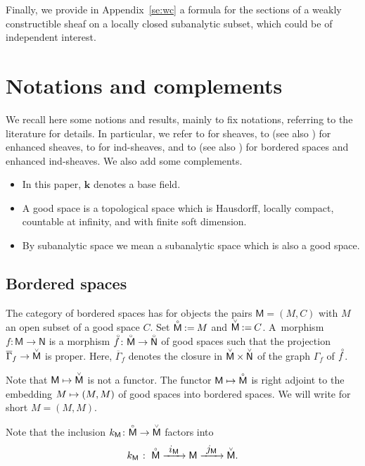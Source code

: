 \documentclass[JEP,XML,SOM,Unicode]{cedram}
\newcommand\mto{\mathchoice{\longmapsto}{\mapsto}{\mapsto}{\mapsto}}
\newcommand{\To}[1][]{\mathchoice{\xrightarrow{\textstyle\kern4pt#1\kern3pt}}{\stackrel{#1}{\longrightarrow}}{}{}}
\theoremstyle{plain}
\theoremstyle{definition}
\newcommand{\field}{\mathbf{k}}\let\cor\field
\newcommand{\bclose}[1]{{\accentset{\vee}{#1}}}\let\cc\bclose
\newcommand{\unbordered}[1]{{\accentset{\circ}{#1}}}
\let\oo \unbordered
\newcommand{\bbM}{\mathsf{M}}
\newcommand{\obM}{\unbordered{\bbM}}
\newcommand{\cbM}{\bclose{\bbM}}
\newcommand{\bbN}{\mathsf{N}}
\newcommand{\obN}{\unbordered{\bbN}}
\newcommand{\cbN}{\bclose{\bbN}}
\newcommand{\inc}[1][\bbM]{k_{#1}}
\let\ccM C
\newcommand{\defeq}{\mathbin{:=}}\let \seteq\defeq
\begin{document}
Finally, we provide in Appendix~\ref{se:wc} a formula for the sections of a weakly constructible sheaf on a locally closed subanalytic subset, which could be of independent interest.

\section{Notations and complements}\label{se:not}
We recall here some notions and results, mainly to fix notations, referring to the literature for details. In particular, we refer to \cite{KS90} for sheaves, to \cite{Tam08} (see also \cite{GS14,DK19}) for enhanced sheaves, to \cite{KS01} for ind-sheaves, and to \cite{DK16} (see also \cite{KS16,Kas16,DK19}) for bordered spaces and enhanced ind-sheaves. We also add some complements.

\begin{itemize}
\item
In this paper, $\field$ denotes a base field.

\item
A good space is a topological space which is Hausdorff, locally compact, countable at infinity, and with finite soft dimension.

\item
By subanalytic space we mean a subanalytic space which is also a good space.
\end{itemize}

\subsection{Bordered spaces}
The category of bordered spaces has for objects the pairs $\bbM=(M,\ccM)$ with $M$ an open subset of a good space $\ccM$. Set $\obM\defeq M$ and $\cbM\defeq\ccM$.
A~morphism $f\colon\bbM\to\bbN$ is a morphism $\oo f\colon \obM\to \obN$ of good spaces such that the projection $\overline\Gamma_f \to \cbM$ is proper. Here, $\overline\Gamma_f$ denotes the closure in $\cbM\times\cbN$ of the graph $\Gamma_f$ of $\oo f$.

Note that $\bbM\mto\cbM$ is not a functor.
The functor $\bbM\mto\obM$ is right adjoint to the embedding $M\mto(M,M)$ of good spaces into bordered spaces.
We will write for short $M=(M,M)$.

Note that the inclusion $\inc\colon\obM\to\cbM$ factors into
\begin{equation}
\label{eq:k}
\inc\;\colon\; \obM \To[i_\bbM] \bbM\To[j_\bbM] \cbM.
\end{equation}
\end{document}

